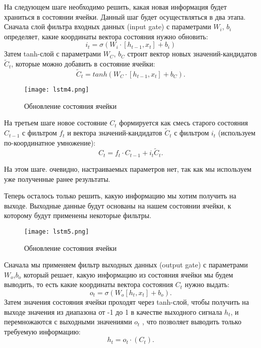 \documentclass{article}
\begin{document}
На следующем шаге необходимо решить, какая новая информация будет храниться в состоянии ячейки. Данный шаг будет осуществляться в два этапа. Сначала слой
фильтра входных данных (input gate) с параметрами $W_i$, $b_i$ определяет, какие
координаты вектора состояния нужно обновить:
$$i_t=\sigma(W_i\cdot [h_{t-1},x_t]+b_i)$$
Затем tanh-слой с параметрами $W_C$, $b_C$ строит вектор новых значений-кандидатов
$\widetilde{C}_t$, которые можно добавить в состояние ячейки:
$$\widetilde{C}_t=tanh(W_C\cdot[h_{t-1},x_t]+b_C).$$

\begin{figure}[H]
	\centering
	    \texttt{[image: lstm4.png]}
	\caption{Обновление состояния ячейки}
\end{figure}

На третьем шаге новое состояние $C_t$ формируется как смесь старого состояния $C_{t-1}$ с фильтром $f_t$ и вектора значений-кандидатов $\widetilde{C}_t$ с фильтром $i_t$ (используем по-координатное умножение):
$$C_t=f_t\cdot C_{t-1}+i_t\widetilde{C}_t.$$
  
На этом шаге. очевидно, настраиваемых параметров нет, так как мы используем
уже полученные ранее результаты.

Теперь осталось только решить, какую информацию мы хотим получить на выходе. Выходные данные будут основаны на нашем состоянии ячейки, к которому будут
применены некоторые фильтры.


      \begin{figure}[H]
	        \centering
	        \texttt{[image: lstm5.png]}
	    \caption{Обновление состояния ячейки}
	    \end{figure}

Сначала мы применяем фильтр выходных данных (output gate) с параметрами
$W_o$,$b_o$ который решает, какую информацию из состояния ячейки мы будем выводить,
то есть какие координаты вектора состояния $C_t$ нужно выдать:
$$o_t=\sigma(W_o[h_t,x_t]+b_o).$$
Затем значения состояния ячейки проходят через tanh-слой, чтобы получить на
выходе значения из диапазона от -1 до 1 в качестве выходного сигнала $h_t$, и перемножаются с выходными значениями $o_t$
, что позволяет выводить только требуемую
информацию:
$$h_t=o_t\cdot(C_t).$$
\end{document}
